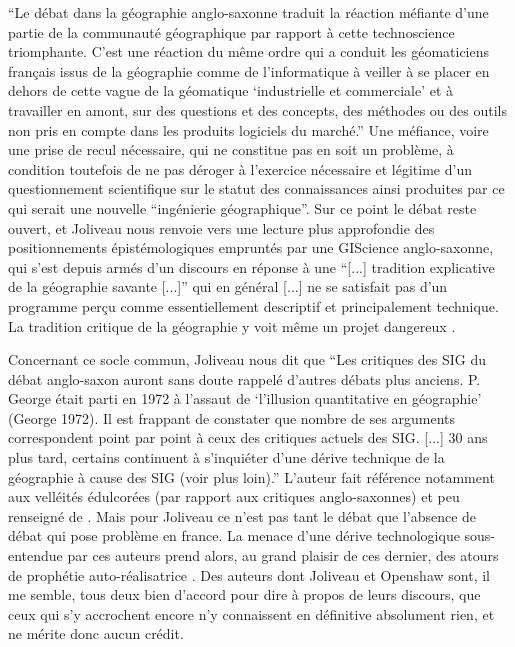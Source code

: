 \enquote{Le débat dans la géographie anglo-saxonne traduit la réaction méfiante d'une partie de la communauté géographique par rapport à cette technoscience triomphante. C'est une réaction du même ordre qui a conduit les géomaticiens français issus de la géographie comme de l'informatique à veiller à se placer en dehors de cette vague de la géomatique \enquote{industrielle et commerciale} et à travailler en amont, sur des questions et des concepts, des méthodes ou des outils non pris en compte dans les produits logiciels du marché.} Une méfiance, voire une prise de recul nécessaire, qui ne constitue pas en soit un problème, à condition toutefois de ne pas déroger à l'exercice nécessaire et légitime d'un questionnement scientifique sur le statut des connaissances ainsi produites par ce qui serait une nouvelle \enquote{ingénierie géographique}. Sur ce point le débat reste ouvert, et Joliveau nous renvoie vers une lecture plus approfondie des positionnements épistémologiques empruntés par une GIScience anglo-saxonne, qui s'est depuis armés d'un discours en réponse à une \enquote{[...] tradition explicative de la géographie savante [...]} qui en général { [...] ne se satisfait pas d'un programme perçu comme essentiellement descriptif et principalement technique. La tradition critique de la géographie y voit même un projet dangereux} \autocite[474-477]{Joliveau2004}.

Concernant ce socle commun, Joliveau nous dit que \enquote{Les critiques des SIG du débat anglo-saxon auront sans doute rappelé d'autres débats plus anciens. P. George était parti en 1972 à l'assaut de \enquote{l'illusion quantitative en géographie} (George 1972). Il est frappant de constater que nombre de ses arguments correspondent point par point à ceux des critiques actuels des SIG. [...] 30 ans plus tard, certains continuent à s'inquiéter d'une dérive technique de la géographie à cause des SIG (voir plus loin).} \autocite[477]{Joliveau2004} L'auteur fait référence notamment aux velléités édulcorées (par rapport aux critiques anglo-saxonnes) et peu renseigné de \autocite{Staszak2001}. Mais pour Joliveau ce n'est pas tant le débat que l'absence de débat qui pose problème en france. La menace d'une dérive technologique sous-entendue par ces auteurs prend alors, au grand plaisir de ces dernier, des atours de prophétie auto-réalisatrice . Des auteurs dont Joliveau  et Openshaw sont, il me semble, tous deux bien d'accord pour dire à propos de leurs discours, que ceux qui s'y accrochent encore n'y connaissent en définitive absolument rien, et ne mérite donc aucun crédit.

